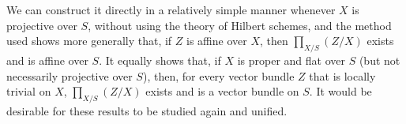   We can construct it directly in a relatively simple manner whenever \(X\) is projective over \(S\), without using the theory of Hilbert schemes, and the method used shows more generally that, if \(Z\) is affine over \(X\), then \(\prod _{X/S}(Z/X)\) exists and is affine over \(S\).
  It equally shows that, if \(X\) is proper and flat over \(S\) (but not necessarily projective over \(S\)), then, for every vector bundle \(Z\) that is locally trivial on \(X\), \(\prod _{X/S}(Z/X)\) exists and is a vector bundle on \(S\).
  It would be desirable for these results to be studied again and unified.